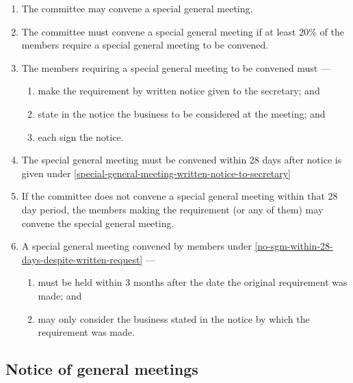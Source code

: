 \documentclass[../constitution.tex]{subfiles}
\begin{document}
\begin{enumerate}

\item The committee may convene a special general meeting.
\item The committee must convene a special general meeting if at least 20\% of the members require a special general meeting to be convened.
\item The members requiring a special general meeting to be convened must ---

  \begin{enumerate}
  
  \item make the requirement by written notice given to the secretary; and \label{special-general-meeting-written-notice-to-secretary}
  \item state in the notice the business to be considered at the meeting; and
  \item each sign the notice.
  \end{enumerate}
\item The special general meeting must be convened within 28 days after notice is given under  \ref{special-general-meeting-written-notice-to-secretary}
\item If the committee does not convene a special general meeting within that 28 day period, the members making the requirement (or any of them) may convene the special general meeting. \label{no-sgm-within-28-days-despite-written-request}
\item A special general meeting convened by members under  \ref{no-sgm-within-28-days-despite-written-request} ---

  \begin{enumerate}
  
  \item must be held within 3 months after the date the original requirement was made; and
  \item may only consider the business stated in the notice by which the requirement was made.
  \end{enumerate}
\end{enumerate}

\hypertarget{notice-of-general-meetings}{%
\subsection{Notice of general meetings}\label{notice-of-general-meetings}}
\end{document}
